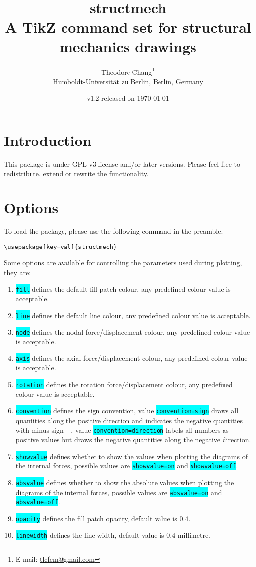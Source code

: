 \documentclass[10pt,a4paper]{article}
\title{structmech\\\large{}A TikZ command set for structural mechanics drawings}
\author{Theodore Chang\footnote{E-mail: \href{tlcfem@gmail.com}{tlcfem@gmail.com}}\\[2mm]\normalsize{}Humboldt-Universität zu Berlin, Berlin, Germany}
\date{\normalsize{}v1.2 released on \today}
\newcommand*{\Highlight}[1]{\colorbox{cyan}{\color{red}\texttt{#1}}}
\begin{document}
\maketitle
\section{Introduction}
This package is under GPL v3 license and/or later versions. Please feel free to redistribute, extend or rewrite the functionality.
\section{Options}
To load the package, please use the following command in the preamble.
\begin{Verbatim}[frame=single,label=Syntax]
\usepackage[key=val]{structmech}
\end{Verbatim}
Some options are available for controlling the parameters used during plotting, they are:
\begin{enumerate}
\item \Highlight{fill} defines the default fill patch colour, any predefined colour value is acceptable.
\item \Highlight{line} defines the default line colour, any predefined colour value is acceptable.
\item \Highlight{node} defines the nodal force/displacement colour, any predefined colour value is acceptable.
\item \Highlight{axis} defines the axial force/displacement colour, any predefined colour value is acceptable.
\item \Highlight{rotation} defines the rotation force/displacement colour, any predefined colour value is acceptable.
\item \Highlight{convention} defines the sign convention, value \Highlight{convention=sign} draws all quantities along the positive direction and indicates the negative quantities with minus sign $-$, value \Highlight{convention=direction} labels all numbers as positive values but draws the negative quantities along the negative direction.
\item \Highlight{showvalue} defines whether to show the values when plotting the diagrams of the internal forces, possible values are \Highlight{showvalue=on} and \Highlight{showvalue=off}.
\item \Highlight{absvalue} defines whether to show the absolute values when plotting the diagrams of the internal forces, possible values are \Highlight{absvalue=on} and \Highlight{absvalue=off}.
\item \Highlight{opacity} defines the fill patch opacity, default value is $0.4$.
\item \Highlight{linewidth} defines the line width, default value is $0.4$ millimetre.
\end{enumerate}
\end{document}
